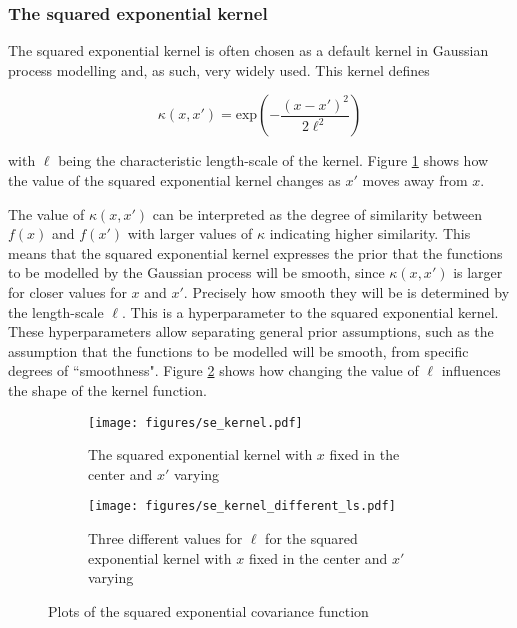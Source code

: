 \documentclass[a4paper,12pt,twoside,openright]{report}
\begin{document}
\subsubsection{The squared exponential kernel}
The squared exponential kernel is often chosen as a default kernel in Gaussian process modelling and, as such, very widely used. This kernel defines 

\begin{equation}
	\kappa(x, x') = \text{exp}(-\frac{(x-x')^2}{2\ell^2})
\end{equation}

with $\ell$ being the characteristic length-scale of the kernel. Figure \ref{sekernel} shows how the value of the squared exponential kernel changes as $x'$ moves away from $x$. 

The value of $\kappa(x, x')$ can be interpreted as the degree of similarity between $f(x)$ and $f(x')$ with larger values of $\kappa$ indicating higher similarity. This means that the squared exponential kernel expresses the prior that the functions to be modelled by the Gaussian process will be smooth, since $\kappa(x, x')$ is larger for closer values for $x$ and $x'$. Precisely how smooth they will be is determined by the length-scale $\ell$. This is a hyperparameter to the squared exponential kernel. These hyperparameters allow separating general prior assumptions, such as the assumption that the functions to be modelled will be smooth, from specific degrees of ``smoothness". Figure \ref{sekernel_ls} shows how changing the value of $\ell$ influences the shape of the kernel function.

\begin{figure}[t]
\centering
\begin{subfigure}{.45\textwidth}
\centering
  \texttt{[image: figures/se\_kernel.pdf]}
  \caption{The squared exponential kernel with $x$ fixed in the center and $x'$ varying}
  \label{sekernel}
\end{subfigure}
\begin{subfigure}{.45\textwidth}
\centering
  \texttt{[image: figures/se\_kernel\_different\_ls.pdf]}
  \caption{Three different values for $\ell$ for the squared exponential kernel with $x$ fixed in the center and $x'$ varying}
  \label{sekernel_ls}
\end{subfigure}
\caption{Plots of the squared exponential covariance function}
\label{se_covfunc}
\end{figure}
\end{document}
